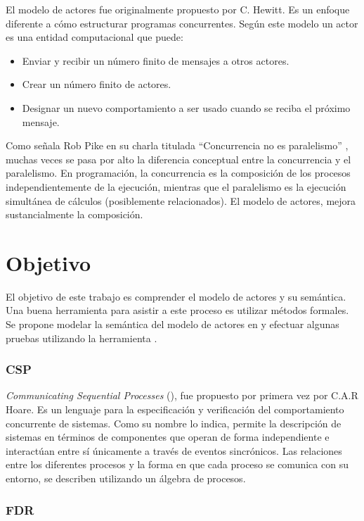 El modelo de actores fue originalmente propuesto por C. Hewitt\cite{Hewitt:1973:UMA:1624775.1624804}. Es un enfoque diferente a cómo estructurar programas concurrentes. Según este modelo un actor es una entidad computacional que puede:

\begin{itemize}
\item Enviar y recibir un número finito de mensajes a otros actores.
\item Crear un número finito de actores.
\item Designar un nuevo comportamiento a ser usado cuando se reciba el próximo mensaje.
\end{itemize}

Como señala Rob Pike en su charla titulada ``Concurrencia no es paralelismo'' \cite{rpike13:cnp}, muchas veces se pasa por alto la diferencia conceptual entre la concurrencia y el paralelismo. En programación, la concurrencia es la composición de los procesos independientemente de la ejecución, mientras que el paralelismo es la ejecución simultánea de cálculos (posiblemente relacionados). El modelo de actores, mejora sustancialmente la composición.

\section{Objetivo}
El objetivo de este trabajo es comprender el modelo de actores y su semántica. Una buena herramienta para asistir a este proceso es utilizar métodos formales. Se propone modelar la semántica del modelo de actores en \CSP y efectuar algunas pruebas utilizando la herramienta \FDR\cite{fdr}.

\subsubsection*{CSP}

\textit{Communicating Sequential Processes} (\CSP), fue propuesto por primera vez por C.A.R Hoare\cite{Hoare:1978:CSP:359576.359585}. Es un lenguaje para la especificación y verificación del comportamiento concurrente de sistemas. Como su nombre lo indica, \CSP permite la descripción de sistemas en términos de componentes que operan de forma independiente e interactúan entre sí únicamente a través de eventos sincrónicos. Las relaciones entre los diferentes procesos y la forma en que cada proceso se comunica con su entorno, se describen utilizando un álgebra de procesos.

\subsubsection*{FDR}

